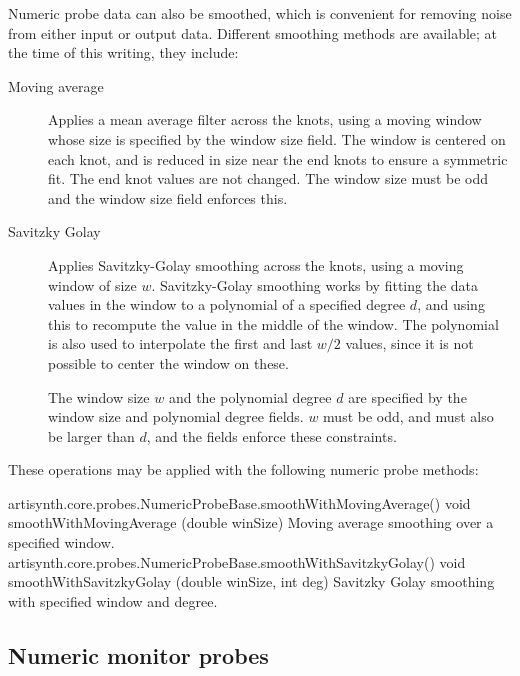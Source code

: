 Numeric probe data can also be smoothed, which is convenient for
removing noise from either input or output data. Different smoothing
methods are available; at the time of this writing, they include:

\begin{description}

\item[Moving average] \mbox{}

Applies a mean average filter across the knots, using a moving window
whose size is specified by the {\sf window size} field. The window is
centered on each knot, and is reduced in size near the end knots to
ensure a symmetric fit. The end knot values are not changed.  The
window size must be odd and the {\sf window size} field enforces this.

\item[Savitzky Golay] \mbox{}

Applies Savitzky-Golay smoothing across the knots, using a moving
window of size $w$.  Savitzky-Golay smoothing works by fitting the
data values in the window to a polynomial of a specified degree $d$, and
using this to recompute the value in the middle of the window.  The
polynomial is also used to interpolate the first and last $w/2$
values, since it is not possible to center the window on these.

The window size $w$ and the polynomial degree $d$ are specified by the
{\sf window size} and {\sf polynomial degree} fields. $w$ must be odd,
and must also be larger than $d$, and the fields enforce these
constraints.

\end{description}

These operations may be applied with the following numeric probe
methods:

%
\begin{methodtable}{0.5}{0.5}
\midline
%
\methodentry
{artisynth.core.probes.NumericProbeBase.smoothWithMovingAverage()}%
{void smoothWithMovingAverage (double winSize)}%
{Moving average smoothing over a specified window.}%
%
\methodentry
{artisynth.core.probes.NumericProbeBase.smoothWithSavitzkyGolay()}%
{void smoothWithSavitzkyGolay (\brh double winSize, int deg)}%
{Savitzky Golay smoothing with specified window and degree.}%
%
\midline
\end{methodtable}
%

\subsection{Numeric monitor probes}
\label{NumericMonitorProbes:sec}

